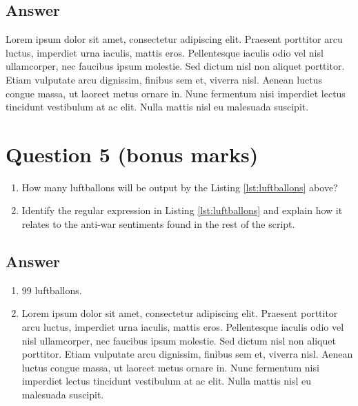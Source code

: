 \documentclass[
	12pt, %
]{../Template/fphw}
\begin{document}

\subsection*{Answer}

Lorem ipsum dolor sit amet, consectetur adipiscing elit. Praesent porttitor arcu luctus, imperdiet urna iaculis, mattis eros. Pellentesque iaculis odio vel nisl ullamcorper, nec faucibus ipsum molestie. Sed dictum nisl non aliquet porttitor. Etiam vulputate arcu dignissim, finibus sem et, viverra nisl. Aenean luctus congue massa, ut laoreet metus ornare in. Nunc fermentum nisi imperdiet lectus tincidunt vestibulum at ac elit. Nulla mattis nisl eu malesuada suscipit.


\section*{Question 5 (bonus marks)}

\begin{problem}
	
	
	\begin{enumerate}
		\item How many luftballons will be output by the Listing \ref{lst:luftballons} above?
		\item Identify the regular expression in Listing \ref{lst:luftballons} and explain how it relates to the anti-war sentiments found in the rest of the script.
	\end{enumerate}

\end{problem}


\subsection*{Answer}

\begin{enumerate}
	\item 99 luftballons.
	\item Lorem ipsum dolor sit amet, consectetur adipiscing elit. Praesent porttitor arcu luctus, imperdiet urna iaculis, mattis eros. Pellentesque iaculis odio vel nisl ullamcorper, nec faucibus ipsum molestie. Sed dictum nisl non aliquet porttitor. Etiam vulputate arcu dignissim, finibus sem et, viverra nisl. Aenean luctus congue massa, ut laoreet metus ornare in. Nunc fermentum nisi imperdiet lectus tincidunt vestibulum at ac elit. Nulla mattis nisl eu malesuada suscipit.
\end{enumerate}
\end{document}
